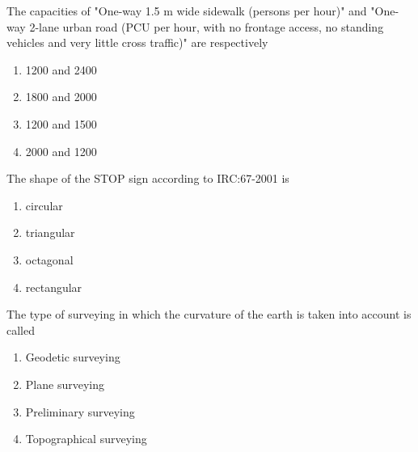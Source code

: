 \iffalse
\usepackage{tikz}
\usetikzlibrary{patterns}
    \author{EE24BTECH11061}
    \section{ce}
    \chapter{2008}
 \fi
\item The capacities of "One-way 1.5 m wide sidewalk (persons per hour)" and "One-way 2-lane urban road (PCU per hour, with no frontage access, no standing vehicles and very little cross traffic)" are respectively
\begin{multicols}{2}
    \begin{enumerate}
        \item 1200 and 2400
        \item 1800 and 2000
        \item 1200 and 1500
        \item 2000 and 1200
    \end{enumerate}
\end{multicols}

\item The shape of the STOP sign according to IRC:67-2001 is
\begin{multicols}{2}
    \begin{enumerate}
        \item circular
        \item triangular
        \item octagonal 
        \item rectangular
    \end{enumerate}
\end{multicols}

\item The type of surveying in which the curvature of the earth is taken into account is called
\begin{multicols}{2}
    \begin{enumerate}
        \item Geodetic surveying
        \item Plane surveying
        \item Preliminary surveying
        \item Topographical surveying
    \end{enumerate}
\end{multicols}

